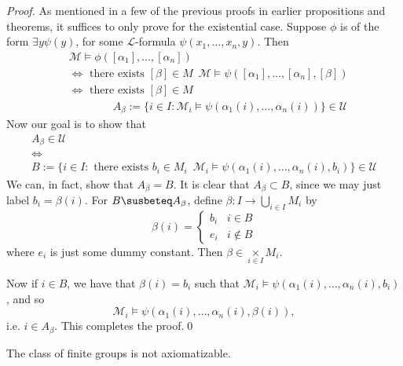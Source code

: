 \documentclass[notoc,notitlepage]{tufte-book}
\begin{document}
\begin{proof}
    \noindent
     As mentioned in a few of the previous proofs in earlier propositions and theorems, it suffices to only prove for the existential case. Suppose $\phi$ is of the form $\exists y \psi(y)$, for some $\mathcal{L}$-formula $\psi(x_1, \ldots, x_n, y)$. Then
    \begin{align*}
      &\mathcal{M} \models \phi([\alpha_1], \ldots, [\alpha_n]) \\
      &\iff \text{ there exists } [ \beta ] \in M \enspace \mathcal{M} \models \psi([\alpha_1], \ldots, [\alpha_n], [\beta]) \\
      &\iff \text{ there exists } [\beta] \in M \enspace \\
      &\qquad\qquad A_\beta := \{ i \in I : \mathcal{M}_i \models \psi(\alpha_1(i), \ldots, \alpha_n(i)) \} \in \mathcal{U}
    \end{align*}
    Now our goal is to show that
    \begin{gather*}
      A_\beta \in \mathcal{U} \\
      \iff \\
      B := \{ i \in I : \text{ there exists } b_i \in M_i \enspace \mathcal{M}_i \models \psi(\alpha_1(i), \ldots, \alpha_n(i), b_i) \} \in \mathcal{U}
    \end{gather*}
    We can, in fact, show that $A_\beta = B$. It is clear that $A_\beta \subset B$, since we may just label $b_i = \beta(i)$. For $B \susbeteq A_\beta$, define $\beta : I \to \bigcup_{i \in I} M_i$ by
    \begin{equation*}
      \beta(i) = \begin{cases}
        b_i & i \in B \\
        e_i & i \notin B
      \end{cases}
    \end{equation*}
    where $e_i$ is just some dummy constant. Then $\beta \in \underset{i \in I}{\times} M_i$.
    
    Now if $i \in B$, we have that $\beta(i) = b_i$ such that $\mathcal{M}_i \models \psi(\alpha_1(i), \ldots, \alpha_n(i), b_i)$, and so
    \begin{equation*}
      \mathcal{M}_i \models \psi(\alpha_1(i), \ldots, \alpha_n(i), \beta(i)),
    \end{equation*}
    i.e. $i \in A_\beta$. This completes the proof.\qed\
\end{proof}

\begin{eg}
  The class of finite groups is not axiomatizable.
\end{eg}
\end{document}
